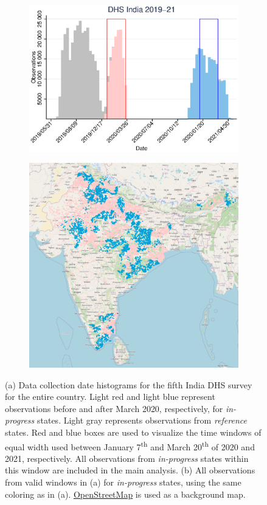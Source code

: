 \documentclass[12pt,a4paper,notitlepage]{article}
\newcommand{\ts}{\textsuperscript}
\begin{document}
\begin{figure}
\begin{subfigure}{.49\textwidth}
\centering
\includegraphics[width=1\linewidth]{dhsHistogram}
\caption{ \label{fig:dhsHistogram}}
\end{subfigure}
\begin{subfigure}{.49\textwidth}
\centering
\includegraphics[width=1\linewidth]{allDataWinterMonthsLight}
\caption{ \label{fig:india_areas}}
\end{subfigure}
\caption{\label{fig:examples} (a) Data collection date histograms for the fifth India DHS survey for the entire country. Light red and light blue represent observations before and after March 2020, respectively, for \textit{in-progress} states. Light gray represents observations from \textit{reference} states. Red and blue boxes are used to visualize the time windows of equal width used between January 7\ts{th} and March 20\ts{th} of 2020 and 2021, respectively. All observations from \textit{in-progress} states within this window are included in the main analysis. (b) All observations from valid windows in (a) for \textit{in-progress} states, using the same coloring as in (a). \href{https://www.openstreetmap.org/copyright}{OpenStreetMap} is used as a background map.}

\end{figure}
\end{document}
